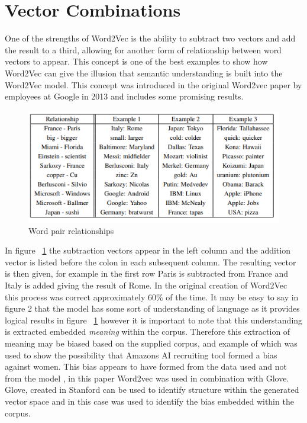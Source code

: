\section{Vector Combinations}
One of the strengths of Word2Vec is the ability to subtract two vectors and add the result to a third, allowing for another form of relationship between word vectors to appear. This concept is one of the best examples to show how Word2Vec can give the illusion that semantic understanding is built into the Word2Vec model. This concept was introduced in the original Word2vec paper by employees at Google in 2013 and includes some promising results.

\begin{figure}[h]
    \centering
    \includegraphics[]{images/learned_relationships}
    \caption{Word pair relationships}
    \label{fig:table_relations}
\end{figure}

\noindent
In figure ~\ref{fig:table_relations} the subtraction vectors appear in the left column and the addition vector is listed before the colon in each subsequent column. The resulting vector is then given, for example in the first row Paris is subtracted from France and Italy is added giving the result of Rome. In the original creation of Word2Vec this process was correct approximately 60\% of the time. \cite{Mikolova} It may be easy to say in figure 2 that the model has some sort of understanding of language as it provides logical results in figure ~\ref{fig:table_relations} however it is important to note that this understanding is extracted embedded \textit{meaning} within the corpus. Therefore this extraction of meaning may be biased based on the supplied corpus, and example of which was used to show the possibility that Amazons AI recruiting tool formed a bias against women. This bias appears to have formed from the data used and not from the model \cite{Caliskan}, in this paper Word2vec was used in combination with Glove. Glove, created in Stanford can be used to identify structure within the generated vector space and in this case was used to identify the bias embedded within the corpus. \cite{Pennington}

